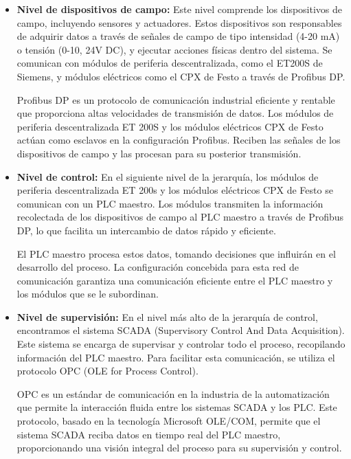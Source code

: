 \begin{itemize}
      \item \textbf{Nivel de dispositivos de campo:} Este nivel comprende los dispositivos de campo, incluyendo sensores y
            actuadores. Estos dispositivos son responsables de adquirir datos a través de señales de campo de tipo intensidad
            (4-20 mA) o tensión (0-10, 24V DC), y ejecutar acciones físicas dentro del sistema. Se comunican con módulos de
            periferia descentralizada, como el ET200S de Siemens, y módulos eléctricos como el CPX de Festo a través de Profibus DP.

            Profibus DP es un protocolo de comunicación industrial eficiente y rentable que proporciona altas velocidades
            de transmisión de datos. Los módulos de periferia descentralizada ET 200S y los módulos eléctricos CPX de Festo
            actúan como esclavos en la configuración Profibus. Reciben las señales de los dispositivos de campo y las
            procesan para su posterior transmisión.


      \item \textbf{Nivel de control:} En el siguiente nivel de la jerarquía, los módulos de periferia descentralizada
            ET 200s y los módulos eléctricos CPX de Festo se comunican con un PLC maestro. Los módulos transmiten la
            información recolectada de los dispositivos de campo al PLC maestro a través de Profibus DP, lo que facilita
            un intercambio de datos rápido y eficiente.

            El PLC maestro procesa estos datos, tomando decisiones que influirán en el desarrollo del proceso. La
            configuración concebida para esta red de comunicación garantiza una comunicación eficiente entre el
            PLC maestro y los módulos que se le subordinan.

      \item \textbf{Nivel de supervisión:} En el nivel más alto de la jerarquía de control, encontramos el
            sistema SCADA (Supervisory Control And Data Acquisition). Este sistema se encarga de supervisar y
            controlar todo el proceso, recopilando información del PLC maestro. Para facilitar esta comunicación,
            se utiliza el protocolo OPC (OLE for Process Control).

            OPC es un estándar de comunicación en la industria de la automatización que permite la interacción
            fluida entre los sistemas SCADA y los PLC. Este protocolo, basado en la tecnología Microsoft OLE/COM,
            permite que el sistema SCADA reciba datos en tiempo real del PLC maestro, proporcionando una visión
            integral del proceso para su supervisión y control.


\end{itemize}

